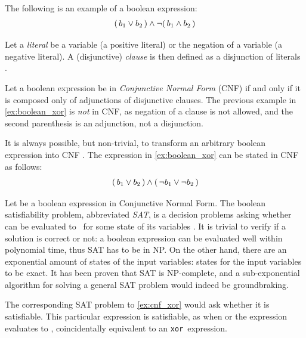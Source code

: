 The following is an example of a boolean expression:
\begin{align}\label{ex:boolean_xor}
	(\, b_1 \lor b_2 \,) \land \neg (\, b_1 \land b_2 \,)
\end{align}

Let a \emph{literal} be a variable  (a positive literal) or the negation of a variable  (a negative literal). A (disjunctive) \emph{clause} is then defined as a disjunction of literals . 

Let a boolean expression be in \emph{Conjunctive Normal Form} (CNF) if and only if it is composed only of adjunctions of disjunctive clauses. The previous example in \cref{ex:boolean_xor} is \emph{not} in CNF, as negation of a clause is not allowed, and the second parenthesis is an adjunction, not a disjunction.

\begin{remark}
	It is always possible, but non-trivial, to transform an arbitrary boolean expression into CNF \cite{?}. The expression in \cref{ex:boolean_xor} can be stated in CNF as follows:
	\begin{align}\label{ex:cnf_xor}
		(\, b_1 \lor b_2 \,) \land (\, \neg b_1 \lor \neg b_2 \,)
	\end{align}
\end{remark}

Let \ilmath{\varphi} be a boolean expression in Conjunctive Normal Form. The boolean satisfiability problem, abbreviated \emph{SAT}, is a decision problems asking whether \ilmath{\varphi} can be evaluated to \true\ for some state of its variables . It is trivial to verify if a solution is correct or not: a boolean expression can be evaluated well within polynomial time, thus SAT has to be in NP. On the other hand, there are an exponential amount of states of the input variables:  states for the  input variables to be exact. It has been proven that SAT is NP-complete, and a sub-exponential algorithm for solving a general SAT problem would indeed be groundbraking. 

The corresponding SAT problem to \cref{ex:cnf_xor} would ask whether it is satisfiable. This particular expression is satisfiable, as when  or  the expression evaluates to \true, coincidentally equivalent to an \texttt{xor}\ expression.


